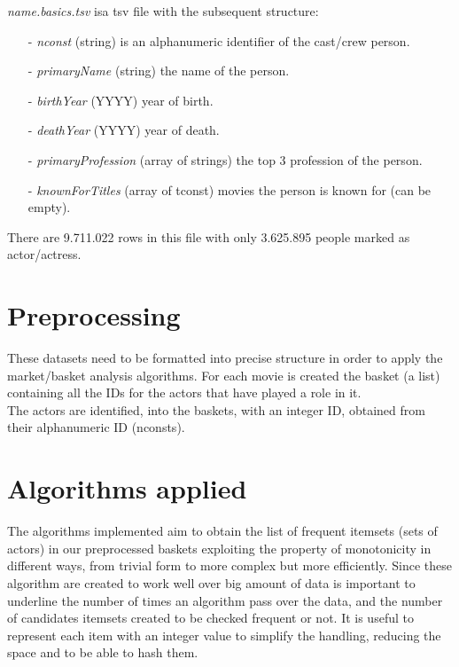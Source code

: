 \documentclass[14pt]{extarticle}
\begin{document}
\noindent
{\it name.basics.tsv} isa  tsv file with the subsequent structure:
\begin{itemize}[leftmargin=*]
\vspace{-0.4cm}\item[-]{\it nconst } (string) is an alphanumeric identifier of the cast/crew person.
\vspace{-1.1cm}\item[-]{\it primaryName } (string) the name of the person.
\vspace{-0.4cm}\item[-]{\it birthYear } (YYYY) year of birth.
\vspace{-0.4cm}\item[-]{\it deathYear  } (YYYY) year of death.
\vspace{-0.4cm}\item[-]{\it primaryProfession } (array of strings) the top 3 profession of the person.
\vspace{-1.0cm}\item[-]{\it knownForTitles  } (array of tconst) movies the person is known for (can be empty).
\end{itemize}
There are 9.711.022 rows in this file with only 3.625.895 people marked as actor/actress.
\section{Preprocessing}
These datasets need to be formatted into precise structure in order to apply the market/basket analysis algorithms. For each movie is created the basket (a list) containing all the IDs for the actors that have played a role in it. \\
The actors are identified, into the baskets, with an integer ID, obtained from their alphanumeric ID (nconsts).
\section{Algorithms applied}
The algorithms implemented aim to obtain the list of frequent itemsets (sets of actors) in our preprocessed baskets exploiting the property of monotonicity in different ways, from trivial form to more complex but more efficiently. Since these algorithm are created to work well over big amount of data is important to underline the number of times an algorithm pass over the data, and the number of candidates itemsets created to be checked frequent or not. It is useful to represent each item with an integer value to simplify the handling, reducing the space and to be able to hash them.
\end{document}
